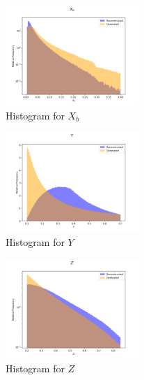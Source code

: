 \documentclass[EPJ,twocolumn]{webofc}
\begin{document}
\begin{figure}[H]
    \centering
    \includegraphics[width=0.45\textwidth]{graphs/hadr_X_b.png}
    \caption{Histogram for $X_b$}
    \label{fig:had_X_b}
\end{figure}
\begin{figure}[H]
    \centering
    \includegraphics[width=0.45\textwidth]{graphs/hadr_Y.png}
    \caption{Histogram for $Y$}
    \label{fig:had_Y}
\end{figure}


\begin{figure}[H]
\centering
    \includegraphics[width=0.45\textwidth]{graphs/hadr_Z.png}
    \caption{Histogram for $Z$}
    \label{fig:had_Z}
\end{figure}


\end{document}
